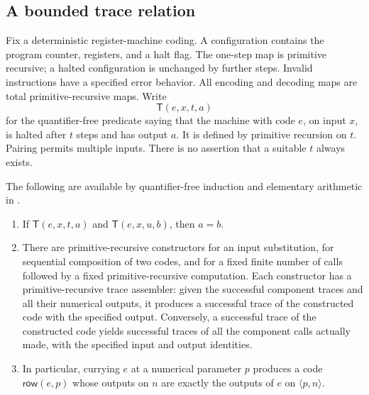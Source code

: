 \subsection{A bounded trace relation}

Fix a deterministic register-machine coding. A configuration contains the
program counter, registers, and a halt flag. The one-step map is primitive
recursive; a halted configuration is unchanged by further steps. Invalid
instructions have a specified error behavior. All encoding and decoding maps
are total primitive-recursive maps. Write
\[
 \mathsf T(e,x,t,a)
\]
for the quantifier-free predicate saying that the machine with code $e$, on
input $x$, is halted after $t$ steps and has output $a$. It is defined by
primitive recursion on $t$. Pairing permits multiple inputs. There is no
assertion that a suitable $t$ always exists.

\begin{lemma}
\label{lem:trace-assembly}
The following are available by quantifier-free induction and elementary
arithmetic in \ipra.
\begin{enumerate}
\item If $\mathsf T(e,x,t,a)$ and $\mathsf T(e,x,u,b)$, then $a=b$.
\item There are primitive-recursive constructors for an input substitution,
for sequential composition of two codes, and for a fixed finite number of
calls followed by a fixed primitive-recursive computation. Each constructor
has a primitive-recursive trace assembler: given the successful component
traces and all their numerical outputs, it produces a successful trace of
the constructed code with the specified output. Conversely, a successful
trace of the constructed code yields successful traces of all the component
calls actually made, with the specified input and output identities.
\item In particular, currying $e$ at a numerical parameter $p$ produces a code
$\mathsf{row}(e,p)$ whose outputs on $n$ are exactly the outputs of $e$ on
$\langle p,n\rangle$.
\end{enumerate}
\end{lemma}

